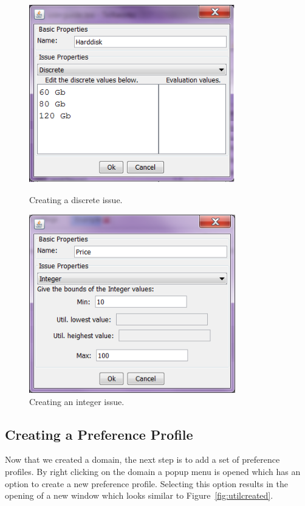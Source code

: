 \documentclass[]{article}
\begin{document}
\begin{figure}[ht]
\begin{minipage}[b]{0.45\linewidth}
\centering
	\includegraphics[width=0.8\textwidth]{media/image7a.png}
\caption{Creating a discrete issue.}
\label{fig:createIssueD}
\end{minipage}
\begin{minipage}[b]{0.45\linewidth}
\centering
	\includegraphics[width=0.8\textwidth]{media/image7b.png}
\caption{Creating an integer issue.}\label{fig:createIssueI}
\end{minipage}
\end{figure}

\subsection{Creating a Preference Profile}
Now that we created a domain, the next step is to add a set of preference profiles. By right clicking on the domain a popup menu is opened which has an option to create a new preference profile. Selecting this option results in the opening of a new window which looks similar to Figure~\ref{fig:utilcreated}.
\end{document}
